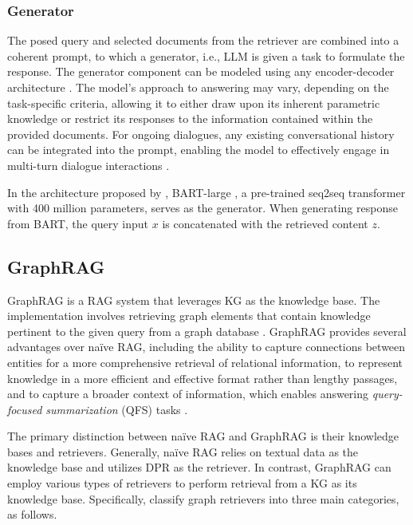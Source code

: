 \subsubsection{Generator}
The posed query and selected documents from the retriever are combined into a coherent prompt, to which a generator, i.e., LLM is given a task to formulate the response. The generator component can be modeled using any encoder-decoder architecture \citep{lewis2021retrievalaugmentedgenerationknowledgeintensivenlp}. The model’s approach to answering may vary, depending on the task-specific criteria, allowing it to either draw upon its inherent parametric knowledge or restrict its responses to the information contained within the provided documents. For ongoing dialogues, any existing conversational history can be integrated into the prompt, enabling the model to effectively engage in multi-turn dialogue interactions \citep{gao2024retrievalaugmentedgenerationlargelanguage}. 

In the architecture proposed by \cite{lewis2021retrievalaugmentedgenerationknowledgeintensivenlp}, BART-large \citep{lewis2019bartdenoisingsequencetosequencepretraining}, a pre-trained seq2seq transformer with 400 million parameters, serves as the generator. When generating response from BART, the query input $x$ is concatenated with the retrieved content $z$.

\subsection{GraphRAG}
GraphRAG is a RAG system that leverages KG as the knowledge base. The implementation involves retrieving graph elements that contain knowledge pertinent to the given query from a graph database \citep{peng2024graphretrievalaugmentedgenerationsurvey}. GraphRAG provides several advantages over na\"{i}ve RAG, including the ability to capture connections between entities for a more comprehensive retrieval of relational information, to represent knowledge in a more efficient and effective format rather than lengthy passages, and to capture a broader context of information, which enables answering \textit{query-focused summarization} (QFS) tasks \citep{peng2024graphretrievalaugmentedgenerationsurvey}. 

The primary distinction between na\"{i}ve RAG and GraphRAG is their knowledge bases and retrievers. Generally, na\"{i}ve RAG relies on textual data as the knowledge base and utilizes DPR as the retriever. In contrast, GraphRAG can employ various types of retrievers to perform retrieval from a KG as its knowledge base. Specifically, \cite{peng2024graphretrievalaugmentedgenerationsurvey} classify graph retrievers into three main categories, as follows.


